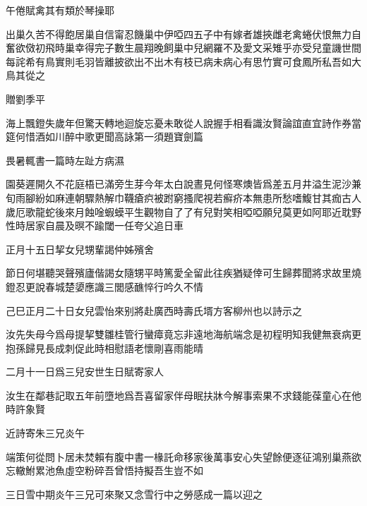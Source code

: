 \documentclass{zhvt-classic-Miya}
\begin{document}
\begin{fw}午倦賦禽其有類於琴操耶\end{fw}

出巢久苦不得飽居巢自信甯忍饑巢中伊啞四五子中有嫁者雄挾雌老禽蜷伏恨無力自奮欲傚初飛時巢幸得完子數生晨翔晚飼巢中兒網羅不及愛文采雉乎亦受兒童譏世間每詫希有鳥實則毛羽皆離披欲出不出木有枝已病未病心有思竹實可食鳳所私吾如大鳥其從之

\begin{fw}贈劉季平\end{fw}

海上飄鐙失歲年但驚天轉地迴旋忘憂未敢從人說握手相看識汝賢論誼直宜詩作券當筵何惜酒如川醉中歌更聞高詠第一須題寶劍篇

\begin{fw}畏暑輒書一篇時左趾方病濕\end{fw}

園葵遲開久不花庭梧已滿旁生芽今年太白說晝見何怪寒燠皆爲差五月井溢生泥沙兼旬雨腳紛如麻連朝驟熱解巾韈瘡疻被跗窮搔爬視若癬疥本無患所愁嗜鰒甘其痂古人歲厄歌龍蛇後來月蝕唫蝦蟆平生觀物自了了有兒對笑相啞啞願兒莫更如阿耶近耽野性時居家自晨及暝不踰閾一任夸父追日車

\begin{fw}正月十五日挈女兒甥輩謁仲姊殯舍\end{fw}

節日何堪聽哭聲殯廬偕謁女隨甥平時篤愛全留此往疾猶疑倖可生歸葬聞將求故里燒鐙忍更說春城楚嬃應識三閭感䩌悴行吟久不情

\begin{fw}己巳正月二十日女兒雲怡來别將赴廣西時壽氏壻方客柳州也以詩示之\end{fw}

汝先失母今爲母提挈雙雛桂管行蠻瘴竟忘非遠地海航端念是初程明知我健無衰病更抱孫歸見長成刺促此時相慰語老懷剛喜雨能晴

\begin{fw}二月十一日爲三兒安世生日賦寄家人\end{fw}

汝生在鄰巷記取五年前墮地爲吾喜留家伴母眠扶牀今解事索果不求錢能葆童心在他時許象賢

\begin{fw}近詩寄朱三兄炎午\end{fw}

端策何從問卜居未焚賴有腹中書一椽託命移家後萬事安心失望餘便逐征鴻别巢燕欲忘轍鮒累池魚虛空粉碎吾曾悟持擬吾生豈不如

\begin{fw}三日雪中期炎午三兄可來聚又念雪行中之勞感成一篇以迎之\end{fw}
\end{document}

